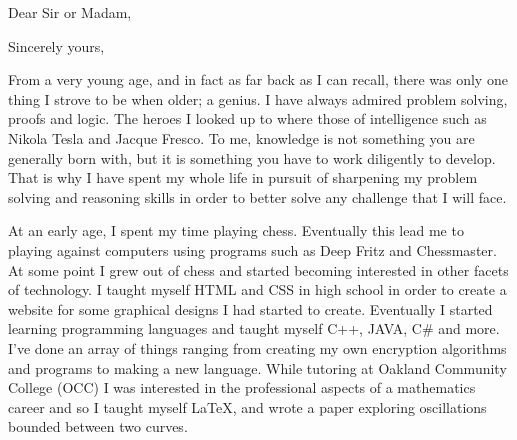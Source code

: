 \documentclass[11pt,a4paper,sans]{moderncv} %
\begin{document}
\makecvtitle 



\date{February 3, 2017} %
\opening{Dear Sir or Madam,} %

\closing{Sincerely yours,} %

\makelettertitle %

\hspace{1cm}From a very young age, and in fact as far back as I can recall, there was only one thing I strove to be when older; a genius. I have always admired problem solving, proofs and logic. The heroes I looked up to where those of intelligence such as Nikola Tesla and Jacque Fresco. To me, knowledge is not something you are generally born with, but it is something you have to work diligently to develop. That is why I have spent my whole life in pursuit of sharpening my problem solving and reasoning skills in order to better solve any challenge that I will face.

\hspace{1cm}At an early age, I spent my time playing chess. Eventually this lead me to playing against computers using programs such as Deep Fritz and Chessmaster. At some point I grew out of chess and started becoming interested in other facets of technology. I taught myself HTML and CSS in high school in order to create a website for some graphical designs I had started to create. Eventually I started learning programming languages and taught myself C++, JAVA, C\# and more. I've done an array of things ranging from creating my own encryption algorithms and programs to making a new language. While tutoring at Oakland Community College (OCC) I was interested in the professional aspects of a mathematics career and so I taught myself \LaTeX, and wrote a paper exploring oscillations bounded between two curves.
\end{document}
